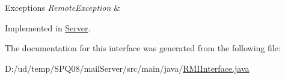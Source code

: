 \begin{DoxyExceptions}{Exceptions}
{\em Remote\+Exception} & \\
\hline
\end{DoxyExceptions}


Implemented in \hyperlink{class_server_a729c6728075152e3550160273869e992}{Server}.



The documentation for this interface was generated from the following file\+:\begin{DoxyCompactItemize}
\item 
D\+:/ud/temp/\+S\+P\+Q08/mail\+Server/src/main/java/\hyperlink{_r_m_i_interface_8java}{R\+M\+I\+Interface.\+java}\end{DoxyCompactItemize}
